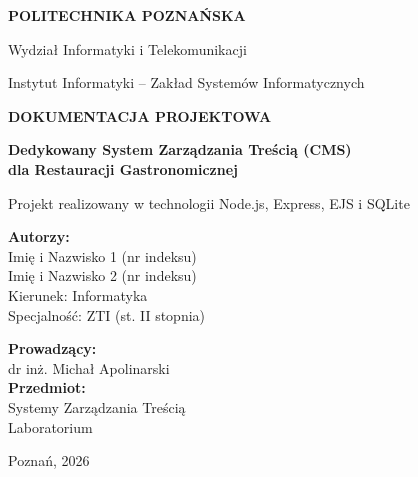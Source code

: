 \documentclass[12pt,a4paper]{article}
\begin{document}
\begin{titlepage}
    \centering
    \vspace*{1cm}
    {\Large\textbf{POLITECHNIKA POZNAŃSKA}\par}
    {\large Wydział Informatyki i Telekomunikacji\par}
    {\large Instytut Informatyki – Zakład Systemów Informatycznych\par}
    
    \vspace{2.5cm}
    {\huge\bfseries DOKUMENTACJA PROJEKTOWA\par}
    \vspace{0.5cm}
    {\Large\textbf{Dedykowany System Zarządzania Treścią (CMS) \\ dla Restauracji Gastronomicznej}\par}
    \vspace{0.3cm}
    {\large Projekt realizowany w technologii Node.js, Express, EJS i SQLite\par}
    
    \vspace{3cm}
    \begin{minipage}{0.45\textwidth}
        \begin{flushleft} \large
            \textbf{Autorzy:}\\
            Imię i Nazwisko 1 (nr indeksu)\\
            Imię i Nazwisko 2 (nr indeksu)\\
            Kierunek: Informatyka\\
            Specjalność: ZTI (st. II stopnia)
        \end{flushleft}
    \end{minipage}
    \hfill
    \begin{minipage}{0.45\textwidth}
        \begin{flushright} \large
            \textbf{Prowadzący:}\\
            dr inż. Michał Apolinarski\\
            \vspace{0.5cm}
            \textbf{Przedmiot:}\\
            Systemy Zarządzania Treścią\\
            Laboratorium
        \end{flushright}
    \end{minipage}

    \vfill
    {\large Poznań, 2026\par}
\end{titlepage}
\end{document}
